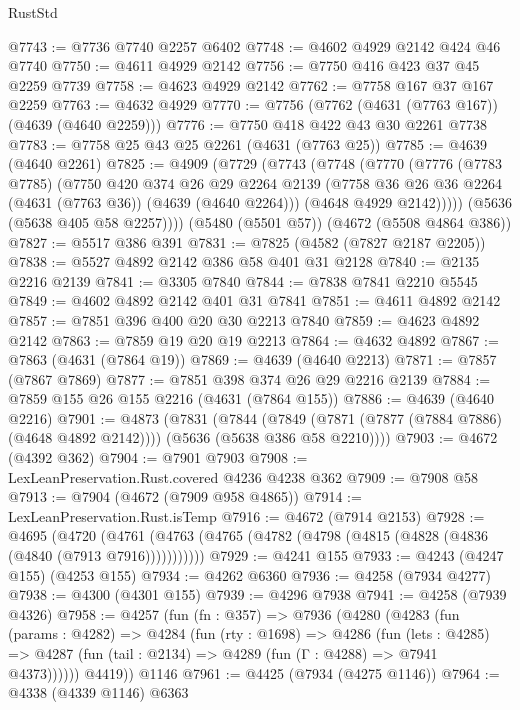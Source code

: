 \begin{lexlean}{RustStd}
\begin{coremodule}
{\begin{coremodule}
{{{{{{{{{{{{{{{{@7743 := @7736 @7740 @2257 @6402
@7748 := @4602 @4929 @2142 @424 @46 @7740
@7750 := @4611 @4929 @2142
@7756 := @7750 @416 @423 @37 @45 @2259 @7739
@7758 := @4623 @4929 @2142
@7762 := @7758 @167 @37 @167 @2259
@7763 := @4632 @4929
@7770 := @7756 (@7762 (@4631 (@7763 @167)) (@4639 (@4640 @2259)))
@7776 := @7750 @418 @422 @43 @30 @2261 @7738
@7783 := @7758 @25 @43 @25 @2261 (@4631 (@7763 @25))
@7785 := @4639 (@4640 @2261)
@7825 := @4909
    (@7729
      (@7743
        (@7748
          (@7770
            (@7776
              (@7783 @7785)
              (@7750
                @420
                @374
                @26
                @29
                @2264
                @2139
                (@7758 @36 @26 @36 @2264 (@4631 (@7763 @36)) (@4639 (@4640 @2264)))
                (@4648 @4929 @2142)))))
        (@5636 (@5638 @405 @58 @2257))))
    (@5480 (@5501 @57))
    (@4672 (@5508 @4864 @386))
@7827 := @5517 @386 @391
@7831 := @7825 (@4582 (@7827 @2187 @2205))
@7838 := @5527 @4892 @2142 @386 @58 @401 @31 @2128
@7840 := @2135 @2216 @2139
@7841 := @3305 @7840
@7844 := @7838 @7841 @2210 @5545
@7849 := @4602 @4892 @2142 @401 @31 @7841
@7851 := @4611 @4892 @2142
@7857 := @7851 @396 @400 @20 @30 @2213 @7840
@7859 := @4623 @4892 @2142
@7863 := @7859 @19 @20 @19 @2213
@7864 := @4632 @4892
@7867 := @7863 (@4631 (@7864 @19))
@7869 := @4639 (@4640 @2213)
@7871 := @7857 (@7867 @7869)
@7877 := @7851 @398 @374 @26 @29 @2216 @2139
@7884 := @7859 @155 @26 @155 @2216 (@4631 (@7864 @155))
@7886 := @4639 (@4640 @2216)
@7901 := @4873
    (@7831
      (@7844
        (@7849 (@7871 (@7877 (@7884 @7886) (@4648 @4892 @2142))))
        (@5636 (@5638 @386 @58 @2210))))
@7903 := @4672 (@4392 @362)
@7904 := @7901 @7903
@7908 := LexLeanPreservation.Rust.covered @4236 @4238 @362
@7909 := @7908 @58
@7913 := @7904 (@4672 (@7909 @958 @4865))
@7914 := LexLeanPreservation.Rust.isTemp
@7916 := @4672 (@7914 @2153)
@7928 := @4695
    (@4720 (@4761 (@4763 (@4765 (@4782 (@4798 (@4815 (@4828 (@4836 (@4840 (@7913 @7916)))))))))))
@7929 := @4241 @155
@7933 := @4243 (@4247 @155) (@4253 @155)
@7934 := @4262 @6360
@7936 := @4258 (@7934 @4277)
@7938 := @4300 (@4301 @155)
@7939 := @4296 @7938
@7941 := @4258 (@7939 @4326)
@7958 := @4257
    (fun (fn : @357) =>
    @7936
      (@4280
        (@4283
          (fun (params : @4282) =>
          @4284
            (fun (rty : @1698) =>
            @4286
              (fun (lets : @4285) =>
              @4287 (fun (tail : @2134) => @4289 (fun (Γ : @4288) => @7941 @4373))))))
        @4419))
    @1146
@7961 := @4425 (@7934 (@4275 @1146))
@7964 := @4338 (@4339 @1146) @6363
}}}}}}}}}}}}}}}}
\end{coremodule}}
\end{coremodule}
\end{lexlean}
